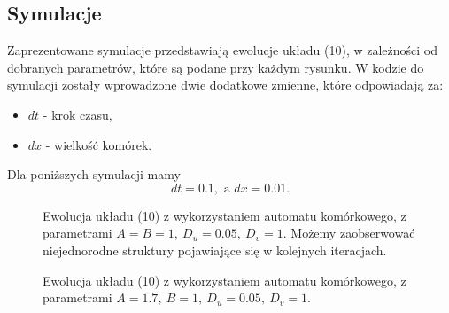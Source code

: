 \documentclass[a4paper,12pt]{article}
\begin{document}
\subsection{Symulacje}
Zaprezentowane symulacje przedstawiają ewolucje układu (10), w zależności od dobranych parametrów, które są podane przy każdym rysunku. W kodzie do symulacji zostały wprowadzone dwie dodatkowe zmienne, które odpowiadają za:
\begin{itemize}
    \item $dt$ - krok czasu,
    \item $dx$ - wielkość komórek.
\end{itemize}
Dla poniższych symulacji mamy $$dt=0.1,\textrm{ a }dx=0.01.$$
\begin{figure}[hb]
\centering
\subfloat[$u(x,t)$]{\label{odnosnik}
\texttt{[image: U\_małeDU\_A=B.png]}}
\quad
{}
\caption{Ewolucja układu (10) z wykorzystaniem automatu komórkowego, z parametrami $A=B=1,\ D_u=0.05,\ D_v=1$. Możemy zaobserwować niejednorodne struktury pojawiające się w kolejnych iteracjach.}
\label{fig:animals}
\end{figure}
\newpage
\begin{figure}[bh]
\centering
{}
\quad
{}
\caption{Ewolucja układu (10) z wykorzystaniem automatu komórkowego, z parametrami $A=1.7,\ B=1,\ D_u=0.05,\ D_v=1$.}
\label{fig:animals}
\end{figure}
\end{document}
